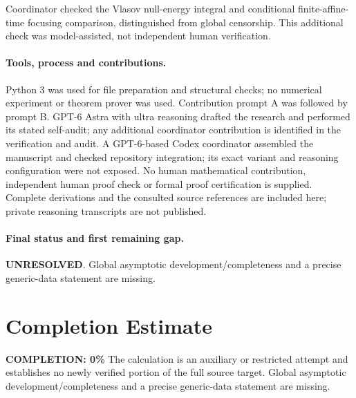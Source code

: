 \documentclass[11pt]{article}
\begin{document}
Coordinator checked the Vlasov null-energy integral and conditional finite-affine-time focusing comparison, distinguished from global censorship. This additional check was model-assisted, not independent human verification.

\paragraph{Tools, process and contributions.}
Python 3 was used for file preparation and structural checks; no numerical experiment or theorem prover was used. Contribution prompt A was followed by prompt B. GPT-6 Astra with ultra reasoning drafted the research and performed its stated self-audit; any additional coordinator contribution is identified in the verification and audit. A GPT-6-based Codex coordinator assembled the manuscript and checked repository integration; its exact variant and reasoning configuration were not exposed. No human mathematical contribution, independent human proof check or formal proof certification is supplied. Complete derivations and the consulted source references are included here; private reasoning transcripts are not published.

\paragraph{Final status and first remaining gap.}
\textbf{UNRESOLVED}. Global asymptotic development/completeness and a precise generic-data statement are missing.

\section{Completion Estimate}
\noindent\textbf{COMPLETION: 0\%}
The calculation is an auxiliary or restricted attempt and establishes no newly verified portion of the full source target. Global asymptotic development/completeness and a precise generic-data statement are missing.
\end{document}
